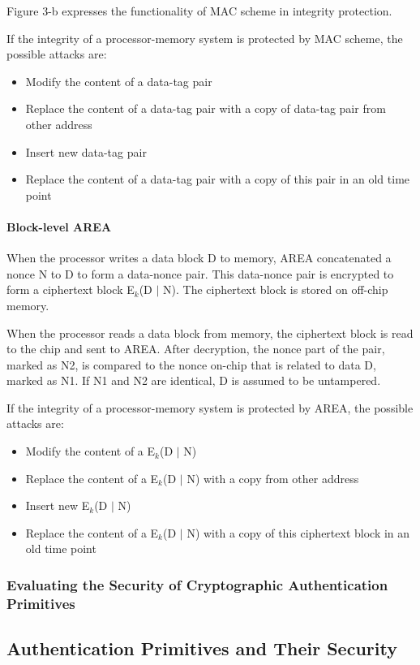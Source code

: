 \documentclass{article}
\begin{document}
Figure 3-b expresses the functionality of MAC scheme in integrity protection.

If the integrity of a processor-memory system is protected by MAC scheme, the possible attacks are:
\begin{itemize}
	\item Modify the content of a data-tag pair
	\item Replace the content of a data-tag pair with a copy of data-tag pair from other address
	\item Insert new data-tag pair
	\item Replace the content of a data-tag pair with a copy of this pair in an old time point
\end{itemize}

\paragraph{Block-level AREA}
When the processor writes a data block D to memory, AREA concatenated a nonce N to D to form a data-nonce pair. This data-nonce pair is encrypted to form a ciphertext block E$_k$(D $\mid$ N). The ciphertext block is stored on off-chip memory.

When the processor reads a data block from memory, the ciphertext block is read to the chip and sent to AREA. After decryption, the nonce part of the pair, marked as N2, is compared to the nonce on-chip that is related to data D, marked as N1. If N1 and N2 are identical, D is assumed to be untampered.

If the integrity of a processor-memory system is protected by AREA, the possible attacks are:
\begin{itemize}
	\item Modify the content of a E$_k$(D $\mid$ N)
	\item Replace the content of a E$_k$(D $\mid$ N) with a copy from other address
	\item Insert new E$_k$(D $\mid$ N)
	\item Replace the content of a E$_k$(D $\mid$ N) with a copy of this ciphertext block in an old time point
\end{itemize}

\subsubsection{Evaluating the Security of Cryptographic Authentication Primitives}

\subsection{Authentication Primitives and Their Security}
\end{document}
